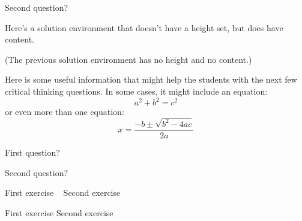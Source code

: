 \begin{activity}
\begin{ctqs}
	\question Second question?
	
		\begin{solution}
		
			Here's a solution environment that doesn't have a height set, but does have content.
			
			(The previous solution environment has no height and no content.)		
		
		\end{solution}
\end{ctqs}

		
\begin{infobox}
	Here is some useful information that might help the students with the next few critical thinking questions.
	In some cases, it might include an equation:
	\begin{equation*}
		a^2 + b^2 = c^2
	\end{equation*}
	or even more than one equation:
	\begin{equation*}
		x=\frac{-b \pm \sqrt{b^2-4ac}}{2a}
	\end{equation*}
\end{infobox}

\begin{ctqs}

	\question First question?
		\begin{solution}[1in]
		\end{solution}
	
	\question Second question?
		\begin{solution}[1in]
		\end{solution}
\end{ctqs}



\begin{exercises}

	\exercise First exercise ~
	\exercise Second exercise
	
\end{exercises}


\begin{problems}

	\problem First exercise
	\problem Second exercise
	
\end{problems}


	
\end{activity}